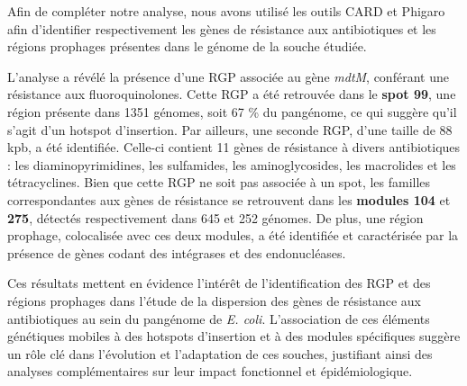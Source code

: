 Afin de compléter notre analyse, nous avons utilisé les outils CARD \cite{alcock_card_2023} et Phigaro \cite{starikova_phigaro_2020} afin d’identifier respectivement les gènes de résistance aux antibiotiques et les régions prophages présentes dans le génome de la souche étudiée.

L’analyse a révélé la présence d’une RGP associée au gène \textit{mdtM}, conférant une résistance aux fluoroquinolones. Cette RGP a été retrouvée dans le \textbf{spot 99}, une région présente dans 1351 génomes, soit 67 \% du pangénome, ce qui suggère qu’il s’agit d’un hotspot d’insertion. Par ailleurs, une seconde RGP, d’une taille de 88 kpb, a été identifiée. Celle-ci contient 11 gènes de résistance à divers antibiotiques : les diaminopyrimidines, les sulfamides, les aminoglycosides, les macrolides et les tétracyclines. Bien que cette RGP ne soit pas associée à un spot, les familles correspondantes aux gènes de résistance se retrouvent dans les \textbf{modules 104} et \textbf{275}, détectés respectivement dans 645 et 252 génomes. De plus, une région prophage, colocalisée avec ces deux modules, a été identifiée et caractérisée par la présence de gènes codant des intégrases et des endonucléases.

Ces résultats mettent en évidence l’intérêt de l'identification des RGP et des régions prophages dans l'étude de la dispersion des gènes de résistance aux antibiotiques au sein du pangénome de \textit{E. coli}. L’association de ces éléments génétiques mobiles à des hotspots d’insertion et à des modules spécifiques suggère un rôle clé dans l’évolution et l’adaptation de ces souches, justifiant ainsi des analyses complémentaires sur leur impact fonctionnel et épidémiologique.